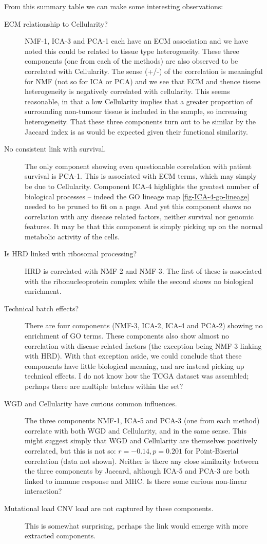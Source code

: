 \documentclass[tikz, 12pt,a4paper,oneside,fleqn]{article}
\begin{document}
From this summary table we can make some interesting observations:
\begin{description}
\item[ECM relationship to Cellularity?]
NMF-1, ICA-3 and PCA-1 each have an ECM association and we have noted this could be related to tissue type heterogeneity.   These three components (one from each of the methods) are also observed to be correlated with Cellularity.  The sense (+/-) of the correlation is meaningful for NMF (not so for ICA or PCA) and we see that ECM and thence tissue heterogeneity is negatively correlated with cellularity. This seems reasonable, in that a low Cellularity implies that a greater proportion of surrounding non-tumour tissue is included in the sample, so increasing heterogeneity.   That these three components turn out to be similar by the Jaccard index is as would be expected given their functional similarity.
\item[No consistent link with survival.]
The only component showing even questionable correlation with patient survival is  PCA-1.  This is associated with ECM terms, which may simply be due to Cellularity.  
Component ICA-4 highlights the greatest number of biological processes -- indeed the GO lineage map \ref{fig-ICA-4-go-lineage} needed to be pruned to fit on a page.  And yet this component shows no correlation with any disease related factors, neither survival nor genomic features.  It may be that this component is simply picking up on the normal metabolic activity of the cells.
\item[Is HRD linked with ribosomal processing?]  HRD is correlated with NMF-2 and NMF-3.  The first of these is associated with the ribonucleoprotein complex while the second shows no biological enrichment.
\item[Technical batch effects?]
There are four components (NMF-3, ICA-2, ICA-4 and PCA-2) showing no enrichment of GO terms.  These components also show almost no correlation with disease related factors (the exception being NMF-3 linking with HRD).  With that exception aside, we could conclude that these components have little biological meaning, and are instead picking up technical effects.  I do not know how the TCGA dataset was assembled; perhaps there are multiple batches within the set?
\item[WGD and Cellularity have curious common influences.]
The three components NMF-1, ICA-5 and PCA-3 (one from each method) correlate with both WGD and Cellularity, and in the same sense. 
This might suggest simply that WGD and Cellularity are themselves positively correlated, but this is not so: $r=-0.14, p=0.201$ for Point-Biserial correlation (data not shown).  Neither is there any close similarity between the three components by Jaccard, although ICA-5 and PCA-3 are both linked to immune response and MHC.   Is there some curious non-linear interaction?
\item[Mutational load CNV load are not captured by these components.]  This is somewhat surprising, perhaps the link would emerge with more extracted components.
\end{description} 
\end{document}
